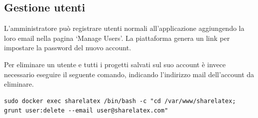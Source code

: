 \subsection{Gestione utenti}
L'amministratore può registrare utenti normali all'applicazione aggiungendo la loro email nella pagina \enquote*{Manage Users}. La piattaforma genera un link per impostare la password del nuovo account.

Per eliminare un utente e tutti i progetti salvati sul suo account è invece necessario eseguire il seguente comando, indicando l'indirizzo mail dell'account da eliminare.
\begin{lstlisting}
sudo docker exec sharelatex /bin/bash -c "cd /var/www/sharelatex; grunt user:delete --email user@sharelatex.com"
\end{lstlisting}

